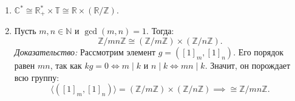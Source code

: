 \begin{Example}{}{}
	\begin{enumerate}
		\item $\mathbb{C}^* \cong \mathbb{R}^*_+ \times \mathbb{T} \cong \mathbb{R} \times (\mathbb{R}/\mathbb{Z})$.
		\item Пусть $m, n \in \mathbb{N}$ и $\gcd(m, n) = 1$. Тогда:
		\[
		\mathbb{Z}/mn\mathbb{Z} \cong (\mathbb{Z}/m\mathbb{Z}) \times (\mathbb{Z}/n\mathbb{Z}).
		\]
		\textit{Доказательство:} Рассмотрим элемент $g = ([1]_m, [1]_n)$. Его порядок равен $mn$, так как $kg = 0 \Leftrightarrow m \mid k$ и $n \mid k \Leftrightarrow mn \mid k$. Значит, он порождает всю группу:
		\[
		\langle ([1]_m, [1]_n) \rangle = (\mathbb{Z}/m\mathbb{Z}) \times (\mathbb{Z}/n\mathbb{Z}) \implies \cong \mathbb{Z}/mn\mathbb{Z}.
		\]
	\end{enumerate}
\end{Example}
